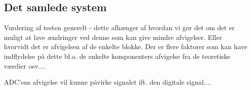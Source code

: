  
\subsection{Det samlede system}
Vurdering af testen generelt - dette afhænger af hvordan vi gør det om det er muligt at lave ændringer ved denne som kan give mindre afvigelser. Eller hvorvidt det er afvigelsen af de enkelte blokke. Der er flere faktorer som kan have indflydelse på dette bl.a. de enkelte komponenters afvigelse fra de teoretiske værdier osv....


ADC'ens afvigelse vil kunne påvirke signalet ift. den digitale signal....